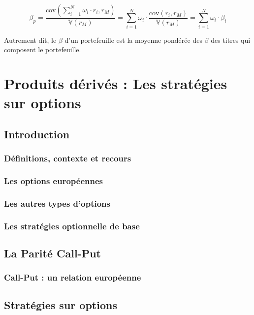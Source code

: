 \documentclass[a4paper, 12pt]{report}
\begin{document}
\[
\beta_p = \frac{\text{cov}\left(\sum_{i=1}^{N} \omega_i \cdot r_i, r_M\right)}{\mathbb{V}(r_M)} = \sum_{i=1}^{N} \omega_i \cdot \frac{\text{cov}(r_i, r_M)}{\mathbb{V}(r_M)} = \sum_{i=1}^{N} \omega_i \cdot \beta_i
\]

Autrement dit, le \( \beta \) d'un portefeuille est la moyenne pondérée des \( \beta \) des titres qui composent le portefeuille.

\chapter{Produits dérivés : Les stratégies sur options}

\section{Introduction}

\subsection{Définitions, contexte et recours}

\subsection{Les options européennes}


\subsection{Les autres types d'options}

\subsection{Les stratégies optionnelle de base}

\section{La Parité Call-Put}

\subsection{Call-Put : un relation européenne}

\section{Stratégies sur options}
\end{document}
